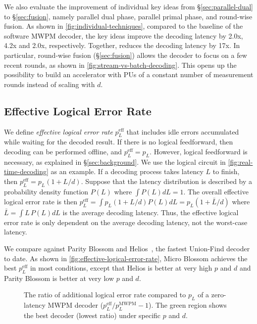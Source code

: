 We also evaluate the improvement of individual key ideas from \S\ref{sec:parallel-dual} to \S\ref{sec:fusion}, namely parallel dual phase, parallel primal phase, and round-wise fusion.
As shown in \autoref{fig:individual-techniques}, compared to the baseline of the software MWPM decoder, the key ideas improve the decoding latency by 2.0x, 4.2x and 2.0x, respectively.
Together, \system reduces the decoding latency by 17x.
In particular, round-wise fusion (\S\ref{sec:fusion}) allows the decoder to focus on a few recent rounds, as shown in \autoref{fig:stream-vs-batch-decoding}.
This opens up the possibility to build an accelerator with PUs of a constant number of measurement rounds instead of scaling with $d$.


\subsection{Effective Logical Error Rate}\label{ssec:eva-real-time}

We define \emph{effective logical error rate} $p^{\text{eff}}_L$ that includes idle errors accumulated while waiting for the decoded result.
If there is no logical feedforward, then decoding can be performed offline, and $p^{\text{eff}}_L = p_L$.
However, logical feedforward is necessary, as explained in \S\ref{sec:background}.
We use the logical circuit in \autoref{fig:real-time-decoding} as an example.
If a decoding process takes latency $L$ to finish, then $p^\text{eff}_L = p_L (1 + L/d)$.
Suppose that the latency distribution is described by a probability density function $P(L)$ where $\int P(L) dL = 1$.
The overall effective logical error rate is then $p^\text{eff}_L = \int p_L (1 + L/d) P(L) dL = p_L (1 + \bar{L}/d)$ where $\bar{L} = \int L\,P(L) dL$ is the average decoding latency.
Thus, the effective logical error rate is only dependent on the average decoding latency, not the worst-case latency.

We compare \system against Parity Blossom and Helios~\cite{liyanage2023qce,liyanage2024fpga}, the fastest Union-Find decoder to date.
As shown in \autoref{fig:effective-logical-error-rate}, Micro Blossom achieves the best $p^\text{eff}_L$ in most conditions, except that Helios is better at very high $p$ and $d$ and Parity Blossom is better at very low $p$ and $d$.

\begin{figure}[t]
    \centering
    \caption{The ratio of additional logical error rate compared to $p_L$ of a zero-latency MWPM decoder ($p^\text{eff}_L / p^\text{MWPM}_L - 1$). The green region shows the best decoder (lowest ratio) under specific $p$ and $d$.}
    \label{fig:effective-logical-error-rate}
\end{figure}

